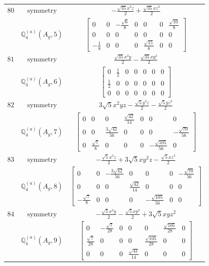 \documentclass[fleqn,8pt,landscape]{jsarticle}
\begin{document}
\begin{longtable}{ccc}
$ 80 $ & $ \text{symmetry} $ & $ - \frac{\sqrt{35} x^{3} z}{2} + \frac{\sqrt{35} x z^{3}}{2} $ \\
$  $ & $ \mathbb{Q}_{4}^{(a)}(A_{g},5) $ & $ \begin{bmatrix} 0 & 0 & - \frac{\sqrt{6}}{8} & 0 & 0 & 0 & \frac{\sqrt{10}}{8} \\ 0 & 0 & 0 & 0 & 0 & 0 & 0 \\ - \frac{1}{8} & 0 & 0 & 0 & \frac{\sqrt{15}}{8} & 0 & 0 \end{bmatrix} $ \\ \hline
$ 81 $ & $ \text{symmetry} $ & $ \frac{\sqrt{35} x^{3} y}{2} - \frac{\sqrt{35} x y^{3}}{2} $ \\
$  $ & $ \mathbb{Q}_{4}^{(a)}(A_{g},6) $ & $ \begin{bmatrix} 0 & \frac{1}{2} & 0 & 0 & 0 & 0 & 0 \\ \frac{1}{2} & 0 & 0 & 0 & 0 & 0 & 0 \\ 0 & 0 & 0 & 0 & 0 & 0 & 0 \end{bmatrix} $ \\ \hline
$ 82 $ & $ \text{symmetry} $ & $ 3 \sqrt{5} x^{2} y z - \frac{\sqrt{5} y^{3} z}{2} - \frac{\sqrt{5} y z^{3}}{2} $ \\
$  $ & $ \mathbb{Q}_{4}^{(a)}(A_{g},7) $ & $ \begin{bmatrix} 0 & 0 & 0 & \frac{\sqrt{42}}{14} & 0 & 0 & 0 \\ 0 & 0 & \frac{3 \sqrt{42}}{56} & 0 & 0 & 0 & - \frac{\sqrt{70}}{56} \\ 0 & \frac{\sqrt{7}}{8} & 0 & 0 & 0 & - \frac{\sqrt{105}}{56} & 0 \end{bmatrix} $ \\ \hline
$ 83 $ & $ \text{symmetry} $ & $ - \frac{\sqrt{5} x^{3} z}{2} + 3 \sqrt{5} x y^{2} z - \frac{\sqrt{5} x z^{3}}{2} $ \\
$  $ & $ \mathbb{Q}_{4}^{(a)}(A_{g},8) $ & $ \begin{bmatrix} 0 & 0 & - \frac{3 \sqrt{42}}{56} & 0 & 0 & 0 & - \frac{\sqrt{70}}{56} \\ 0 & 0 & 0 & \frac{\sqrt{42}}{14} & 0 & 0 & 0 \\ - \frac{\sqrt{7}}{8} & 0 & 0 & 0 & - \frac{\sqrt{105}}{56} & 0 & 0 \end{bmatrix} $ \\ \hline
$ 84 $ & $ \text{symmetry} $ & $ - \frac{\sqrt{5} x^{3} y}{2} - \frac{\sqrt{5} x y^{3}}{2} + 3 \sqrt{5} x y z^{2} $ \\
$  $ & $ \mathbb{Q}_{4}^{(a)}(A_{g},9) $ & $ \begin{bmatrix} 0 & - \frac{\sqrt{7}}{28} & 0 & 0 & 0 & \frac{\sqrt{105}}{28} & 0 \\ \frac{\sqrt{7}}{28} & 0 & 0 & 0 & \frac{\sqrt{105}}{28} & 0 & 0 \\ 0 & 0 & 0 & \frac{\sqrt{42}}{14} & 0 & 0 & 0 \end{bmatrix} $ \\ \hline

\end{longtable}
\end{document}
